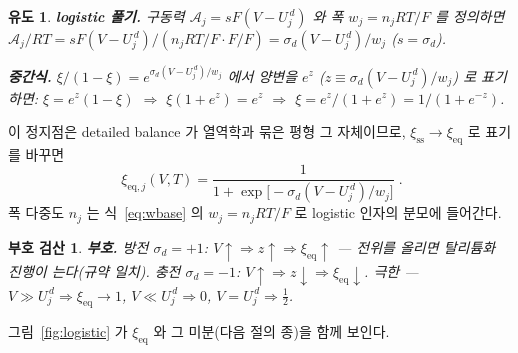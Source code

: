 \documentclass[11pt,a4paper]{article}
\newtheorem*{signbox}{부호 검산}
\newtheorem*{derivebox}{유도}
\newcommand{\eq}{\mathrm{eq}}
\newcommand{\sstat}{\mathrm{ss}}
\begin{document}
\begin{derivebox}
\textbf{logistic 풀기.} 구동력 $\mathcal A_j=sF(V-U_j^{\,d})$ 와 폭 $w_j=n_jRT/F$ 를 정의하면
$\mathcal A_j/RT=sF(V-U_j^{\,d})/(n_jRT/F\cdot F/F)=\sigma_d(V-U_j^{\,d})/w_j$ ($s=\sigma_d$).

\textbf{중간식.} $\xi/(1-\xi)=e^{\sigma_d(V-U_j^{\,d})/w_j}$ 에서 양변을 $e^z$ ($z\equiv\sigma_d(V-U_j^{\,d})/w_j$) 로 표기하면:
$\xi=e^z(1-\xi)$ $\Rightarrow$ $\xi(1+e^z)=e^z$ $\Rightarrow$ $\xi=e^z/(1+e^z)=1/(1+e^{-z})$.
\end{derivebox}

이 정지점은 detailed balance 가 열역학과 묶은 평형 그 자체이므로, $\xi_{\sstat}\to\xi_\eq$ 로 표기를 바꾸면
\begin{equation}
\boxed{\;\xi_{\eq,j}(V,T)=\frac{1}{1+\exp\!\big[-\sigma_d(V-U_j^{\,d})/w_j\big]}\;.}
\label{eq:xieq}
\end{equation}
폭 다중도 $n_j$ 는 식~\eqref{eq:wbase} 의 $w_j=n_jRT/F$ 로 logistic 인자의 분모에 들어간다.

\begin{signbox}
\textbf{부호.} 방전 $\sigma_d=+1$: $V\!\uparrow\Rightarrow z\!\uparrow\Rightarrow\xi_\eq\!\uparrow$ — 전위를 올리면
탈리튬화 진행이 는다(규약 일치). 충전 $\sigma_d=-1$: $V\!\uparrow\Rightarrow z\!\downarrow\Rightarrow\xi_\eq\!\downarrow$.
극한 — $V\gg U_j^{\,d}\Rightarrow\xi_\eq\to1$, $V\ll U_j^{\,d}\Rightarrow0$, $V=U_j^{\,d}\Rightarrow\tfrac12$.
\end{signbox}

그림~\ref{fig:logistic} 가 $\xi_\eq$ 와 그 미분(다음 절의 종)을 함께 보인다.
\end{document}
